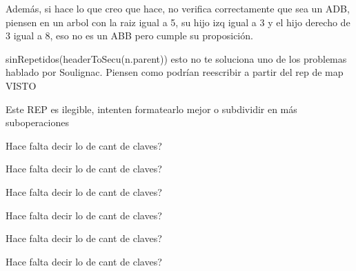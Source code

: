 \begin{DoxyRefList}
Además, si hace lo que creo que hace, no verifica correctamente que sea un A\+DB, piensen en un arbol con la raiz igual a 5, su hijo izq igual a 3 y el hijo derecho de 3 igual a 8, eso no es un A\+BB pero cumple su proposición.

sin\+Repetidos(header\+To\+Secu(n.\+parent)) esto no te soluciona uno de los problemas hablado por Soulignac. Piensen como podrían reescribir a partir del rep de map V\+I\+S\+TO 
\item[\label{deprecated__deprecated000018}%
\hypertarget{deprecated__deprecated000018}{}%
Grupo \hyperlink{classaed2_1_1map_amgrpd5e8970aaf64693c88c5cfe5802755da}{Estructura de representación} ]Este R\+EP es ilegible, intenten formatearlo mejor o subdividir en más suboperaciones

Hace falta decir lo de cant de claves?

Hace falta decir lo de cant de claves?

Hace falta decir lo de cant de claves?

Hace falta decir lo de cant de claves?

Hace falta decir lo de cant de claves?

Hace falta decir lo de cant de claves?
\end{DoxyRefList}